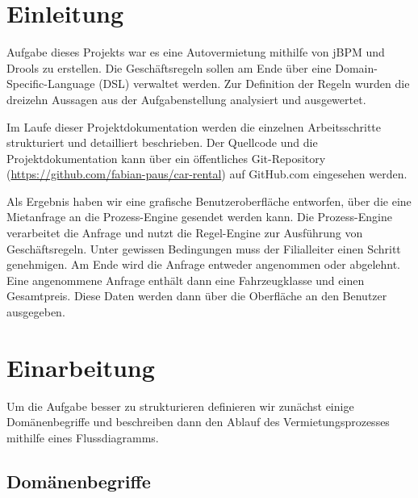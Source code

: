 



\setcounter{secnumdepth}{3}
\setcounter{tocdepth}{2}

\pagestyle{empty}


\tableofcontents
\setcounter{page}{1}

\pagestyle{scrheadings}

\newpage

\section{Einleitung}

Aufgabe dieses Projekts war es eine Autovermietung mithilfe von jBPM und Drools zu erstellen. Die Geschäftsregeln sollen am Ende über eine Domain-Specific-Language (DSL) verwaltet werden. Zur Definition der Regeln wurden die dreizehn Aussagen aus der Aufgabenstellung analysiert und ausgewertet. 

Im Laufe dieser Projektdokumentation werden die einzelnen Arbeitsschritte strukturiert und detailliert beschrieben. Der Quellcode und die Projektdokumentation kann über ein öffentliches Git-Repository (\url{https://github.com/fabian-paus/car-rental}) auf GitHub.com eingesehen werden. 

Als Ergebnis haben wir eine grafische Benutzeroberfläche entworfen, über die eine Mietanfrage an die Prozess-Engine gesendet werden kann. Die Prozess-Engine verarbeitet die Anfrage und nutzt die Regel-Engine zur Ausführung von Geschäftsregeln.
Unter gewissen Bedingungen muss der Filialleiter einen Schritt genehmigen.
Am Ende wird die Anfrage entweder angenommen oder abgelehnt. Eine angenommene Anfrage enthält dann eine Fahrzeugklasse und einen Gesamtpreis. Diese Daten werden dann über die Oberfläche an den Benutzer ausgegeben. 

\section{Einarbeitung}

Um die Aufgabe besser zu strukturieren definieren wir zunächst einige Domänenbegriffe und 
beschreiben dann den Ablauf des Vermietungsprozesses mithilfe eines Flussdiagramms.

\subsection{Domänenbegriffe}

